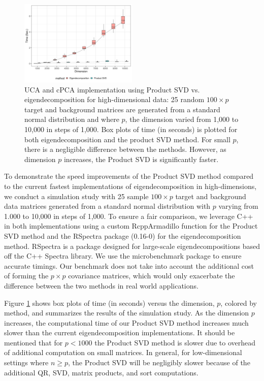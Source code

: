 \documentclass[nocrop]{bioinfo}
\begin{document}
\begin{methods}
\begin{figure}[!tpb]
    \centering
  \includegraphics[width = 0.5\textwidth]{figure/final_perf_color_line.png}
  \caption{UCA and cPCA implementation using Product SVD vs. eigendecomposition for high-dimensional data: 25 random $100 \times p $ target and background matrices are generated from a standard normal distribution and where $p$, the dimension varied from 1,000 to 10,000 in steps of 1,000. Box plots of time (in seconds) is plotted for both eigendecomposition and the product SVD method. For small $p$, there is a negligible difference between the methods. However, as dimension $p$ increases, the Product SVD is significantly faster.}
  \label{fig:computational_perf}
\end{figure}

To demonstrate the speed improvements of the Product SVD method compared to the current fastest implementations of eigendecomposition in high-dimensions, we conduct a simulation study with 25 sample $100 \times p$ target and background data matrices generated from a standard normal distribution with $p$ varying from 1.000 to 10,000 in steps of 1,000. To ensure a fair comparison, we leverage C++ in both implementations using a custom RcppArmadillo \cite{rcpparmadillo} function for the Product SVD method and the RSpectra package (0.16-0) \cite{Rspectra} for the eigendecomposition method. RSpectra is a package designed for large-scale eigendecompositions based off the C++ Spectra library. We use the microbenchmark package \cite{microbenchmark} to ensure accurate timings. Our benchmark does not take into account the additional cost of forming the $p\times p$ covariance matrices, which would only exacerbate the difference between the two methods in real world applications.

Figure \ref{fig:computational_perf} shows box plots of time (in seconds) versus the dimension, $p$, colored by method, and summarizes the results of the simulation study. As the dimension $p$ increases, the computational time of our Product SVD method increases much slower than the current eigendecomposition implementations. It should be mentioned that for $p < 1000$ the Product SVD method is slower due to overhead of additional computation on small matrices. In general, for low-dimensional settings where $n \geq p$, the Product SVD will be negligibly slower because of the additional QR, SVD, matrix products, and sort computations. 

\end{methods}
\end{document}
